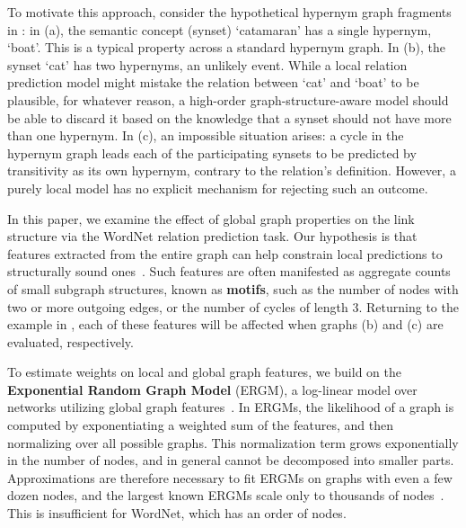 \documentclass[11pt,twocolumn]{article}
\newcommand{\WN}[0]{WordNet}
\newcommand{\ergm}[0]{ERGM}
\begin{document}
To motivate this approach, consider the hypothetical hypernym graph fragments in : in (a), the semantic concept (synset) `catamaran' has a single hypernym, `boat'. This is a typical property across a standard hypernym graph.
	In (b), the synset `cat' has two hypernyms, an unlikely event.
While a local relation prediction model might mistake the relation between `cat' and `boat' to be plausible, for whatever reason, a high-order graph-structure-aware model should be able to discard it based on the knowledge that a synset should not have more than one hypernym.
In (c), an impossible situation arises: a cycle in the hypernym graph leads each of the participating synsets to be predicted by transitivity as its own hypernym, contrary to the relation's definition.
However, a purely local model has no explicit mechanism for rejecting such an outcome.

In this paper, we examine the effect of global graph properties on the link structure via the \WN{} relation prediction task.
Our hypothesis is that features extracted from the entire graph can help constrain local predictions to structurally sound ones~\cite{guo2007recovering}.
Such features are often manifested as aggregate counts of small subgraph structures, known as \textbf{motifs}, such as the number of nodes with two or more outgoing edges, or the number of cycles of length 3.
Returning to the example in , each of these features will be affected when graphs (b) and (c) are evaluated, respectively.

To estimate weights on local and global graph features, we build on the \textbf{Exponential Random Graph Model} (\ergm), a log-linear model over networks utilizing global graph features~\cite{holland1981exponential}.
In \ergm{}s, the likelihood of a graph is computed by exponentiating a weighted sum of the features, and then normalizing over all possible graphs.
This normalization term grows exponentially in the number of nodes, and in general cannot be decomposed into smaller parts.
Approximations are therefore necessary to fit \ergm{}s on graphs with even a few dozen nodes, and the largest known \ergm{}s scale only to thousands of nodes~\citep{schmid2017exponential}.
This is insufficient for \WN{}, which has an order of  nodes.
\end{document}
